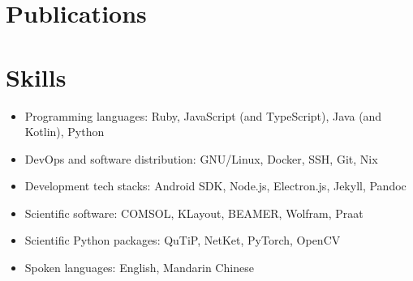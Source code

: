 \documentclass[letterpaper,12pt]{article}
\begin{document}
\section{Publications}
\begin{refsection}
\nocite{*}
\printbibliography[heading=none]
\end{refsection}

\section{Skills}
\begin{itemize}
	\item Programming languages: Ruby, JavaScript (and TypeScript),
	Java (and Kotlin), Python
	\item DevOps and software distribution: GNU/Linux, Docker, SSH, Git, Nix
	\item Development tech stacks: Android SDK, Node.js, Electron.js, Jekyll, Pandoc
	\item Scientific software: COMSOL, KLayout, BEAMER, Wolfram, Praat
	\item Scientific Python packages: QuTiP, NetKet, PyTorch, OpenCV
	\item Spoken languages: English, Mandarin Chinese
\end{itemize}

\vfill
{}
\end{document}

